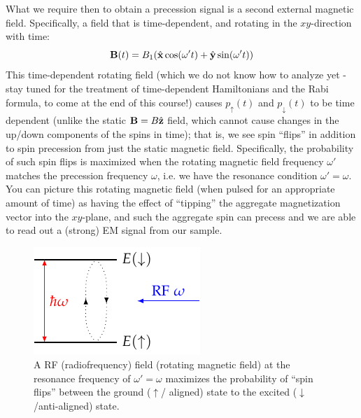 What we require then to obtain a precession signal is a second external magnetic field. Specifically, a field that is time-dependent, and rotating in the $xy$-direction with time:
\begin{equation}
    \mathbf{B}(t) = B_1(\hat{\mathbf{x}}\cos(\omega' t) + \hat{\mathbf{y}}\sin(\omega' t))
\end{equation}
This time-dependent rotating field (which we do not know how to analyze yet - stay tuned for the treatment of time-dependent Hamiltonians and the Rabi formula, to come at the end of this course!) causes $p_\uparrow(t)$ and $p_\downarrow(t)$ to be time dependent (unlike the static $\mathbf{B} = B\hat{\mathbf{z}}$ field, which cannot cause changes in the up/down components of the spins in time); that is, we see spin ``flips'' in addition to spin precession from just the static magnetic field. Specifically, the probability of such spin flips is maximized when the rotating magnetic field frequency $\omega'$ matches the precession frequency $\omega$, i.e. we have the resonance condition $\omega' = \omega$. You can picture this rotating magnetic field (when pulsed for an appropriate amount of time) as having the effect of ``tipping'' the aggregate magnetization vector into the $xy$-plane, and such the aggregate spin can precess and we are able to read out a (strong) EM signal from our sample.

\begin{figure}[htbp]
    \centering
    \includegraphics{Images/fig-Rabi.pdf}

    \caption{A RF (radiofrequency) field (rotating magnetic field) at the resonance frequency of $\omega' = \omega$ maximizes the probability of ``spin flips'' between the ground ($\uparrow$/ aligned) state to the excited ($\downarrow$/anti-aligned) state.}
    \label{fig-Rabi}
\end{figure}

